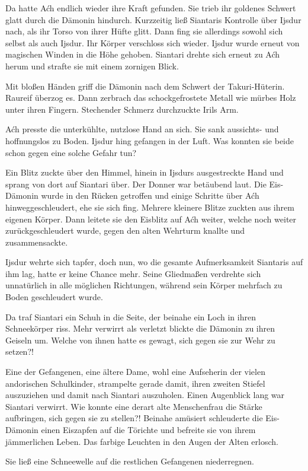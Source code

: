 Da hatte Aćh endlich wieder ihre Kraft gefunden. Sie trieb ihr goldenes Schwert glatt durch die Dämonin hindurch. Kurzzeitig ließ Siantaris Kontrolle über Ijsdur nach, als ihr Torso von ihrer Hüfte glitt. Dann fing sie allerdings sowohl sich selbst als auch Ijsdur. Ihr Körper verschloss sich wieder. Ijsdur wurde erneut von magischen Winden in die Höhe gehoben. Siantari drehte sich erneut zu Aćh herum und strafte sie mit einem zornigen Blick.

Mit bloßen Händen griff die Dämonin nach dem Schwert der Takuri-Hüterin. Raureif überzog es. Dann zerbrach das schockgefrostete Metall wie mürbes Holz unter ihren Fingern. Stechender Schmerz durchzuckte Irils Arm.

Aćh presste die unterkühlte, nutzlose Hand an sich. Sie sank aussichts- und hoffnungslos zu Boden. Ijsdur hing gefangen in der Luft. Was konnten sie beide schon gegen eine solche Gefahr tun?

Ein Blitz zuckte über den Himmel, hinein in Ijsdurs ausgestreckte Hand und sprang von dort auf Siantari über. Der Donner war betäubend laut. Die Eis-Dämonin wurde in den Rücken getroffen und einige Schritte über Aćh hinweggeschleudert, ehe sie sich fing. Mehrere kleinere Blitze zuckten aus ihrem eigenen Körper. Dann leitete sie den Eisblitz auf Aćh weiter, welche noch weiter zurückgeschleudert wurde, gegen den alten Wehrturm knallte und zusammensackte.

Ijsdur wehrte sich tapfer, doch nun, wo die gesamte Aufmerksamkeit Siantaris auf ihm lag, hatte er keine Chance mehr. Seine Gliedmaßen verdrehte sich unnatürlich in alle möglichen Richtungen, während sein Körper mehrfach zu Boden geschleudert wurde.

Da traf Siantari ein Schuh in die Seite, der beinahe ein Loch in ihren Schneekörper riss. Mehr verwirrt als verletzt blickte die Dämonin zu ihren Geiseln um. Welche von ihnen hatte es gewagt, sich gegen sie zur Wehr zu setzen?!

Eine der Gefangenen, eine ältere Dame, wohl eine Aufseherin der vielen andorischen Schulkinder, strampelte gerade damit, ihren zweiten Stiefel auszuziehen und damit nach Siantari auszuholen. Einen Augenblick lang war Siantari verwirrt. Wie konnte eine derart alte Menschenfrau die Stärke aufbringen, sich gegen sie zu stellen?! Beinahe amüsiert schleuderte die Eis-Dämonin einen Eiszapfen auf die Törichte und befreite sie von ihrem jämmerlichen Leben. Das farbige Leuchten in den Augen der Alten erlosch.

Sie ließ eine Schneewelle auf die restlichen Gefangenen niederregnen.

